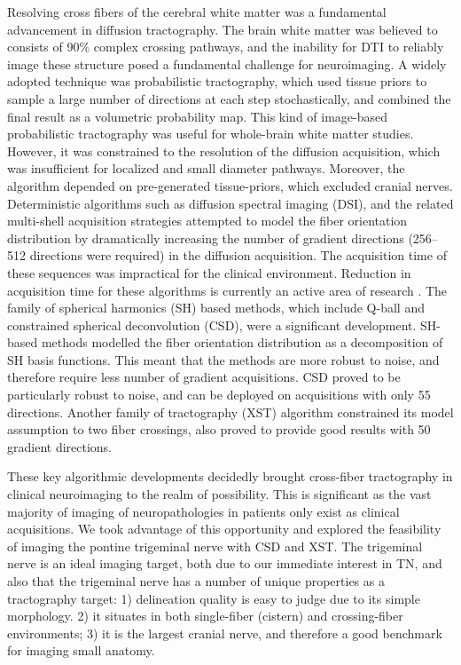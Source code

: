 Resolving cross fibers of the cerebral white matter was a fundamental advancement in diffusion tractography. The brain white matter was believed to consists of 90\% complex crossing pathways, and the inability for DTI to reliably image these structure posed a fundamental challenge for neuroimaging. 
A widely adopted technique was probabilistic tractography, which used tissue priors to sample a large number of directions at each step stochastically, and combined the final result as a volumetric probability map. This kind of image-based probabilistic tractography was useful for whole-brain white matter studies. However, it was constrained to the resolution of the diffusion acquisition, which was insufficient for localized and small diameter pathways. Moreover, the algorithm depended on pre-generated tissue-priors, which excluded cranial nerves. 
Deterministic algorithms such as diffusion spectral imaging (DSI), and the related multi-shell acquisition strategies attempted to model the fiber orientation distribution by dramatically increasing the number of gradient directions (256--512 directions were required) in the diffusion acquisition. The acquisition time of these sequences was impractical for the clinical environment. Reduction in acquisition time for these algorithms is currently an active area of research \cite{}.
The family of spherical harmonics (SH) based methods, which include Q-ball and constrained spherical deconvolution (CSD), were a significant development. SH-based methods modelled the fiber orientation distribution as a decomposition of SH basis functions. This meant that the methods are more robust to noise, and therefore require less number of gradient acquisitions. CSD proved to be particularly robust to noise, and can be deployed on acquisitions with only 55 directions. Another family of tractography (XST) algorithm constrained its model assumption to two fiber crossings, also proved to provide good results with 50 gradient directions.

These key algorithmic developments decidedly brought cross-fiber tractography in clinical neuroimaging to the realm of possibility. This is significant as the vast majority of imaging of neuropathologies in patients only exist as clinical acquisitions. We took advantage of this opportunity and explored the feasibility of imaging the pontine trigeminal nerve with CSD and XST. The trigeminal nerve is an ideal imaging target, both due to our immediate interest in TN, and also that the trigeminal nerve has a number of unique properties as a tractography target: 1) delineation quality is easy to judge due to its simple morphology. 2) it situates in both single-fiber (cistern) and crossing-fiber environments; 3) it is the largest cranial nerve, and therefore a good benchmark for imaging small anatomy.

